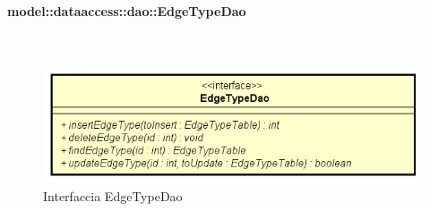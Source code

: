 \documentclass[../DefinizioneDiProdotto.tex]{subfiles}
\begin{document}
\paragraph{model::dataaccess::dao::EdgeTypeDao}
\
\begin{figure}[H]
	\centering
	\includegraphics[width=\maxwidth]{img/EdgeTypeDao.png}
	\caption{Interfaccia EdgeTypeDao}\label{fig:model::dataaccess::dao::EdgeTypeDao} 
\end{figure}
\end{document}
